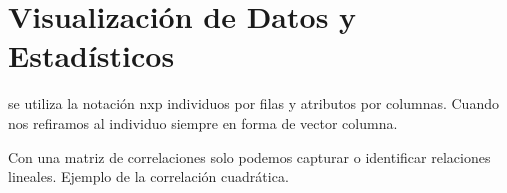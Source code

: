 
\newcommand{\estudiante}{García Justel, Alan}
\newcommand{\titulo}{MÁSTER EN INGENIERÍA COMPUTACIONAL Y SISTEMAS INTELIGENTES}
\newcommand{\asignatura}{EXPLORACIÓN Y ANÁLISIS DE DATOS}
\newcommand{\portada}{common/no_signal.png}
\newcommand{\colorportada}{title_green}
\newcommand{\curso}{2024-2025}



\newpage

\section{Visualización de Datos y Estadísticos}
se utiliza la notación nxp individuos por filas y atributos por columnas. Cuando nos refiramos al individuo siempre en forma de vector columna.



Con una matriz de correlaciones solo podemos capturar o identificar relaciones lineales. Ejemplo de la correlación cuadrática.
